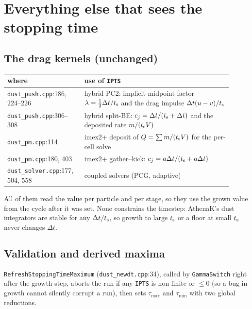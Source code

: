 \documentclass[11pt]{article}
\newcommand{\code}[1]{\texttt{#1}}
\newcommand{\file}[1]{\texttt{\small #1}}
\newcommand{\fn}[1]{\texttt{\small #1}}
\newcommand{\ts}{t_{\rm s}}
\begin{document}
\section{Everything else that sees the stopping time}\label{sec:consumers}

\subsection{The drag kernels (unchanged)}
\begin{longtable}{>{\raggedright}p{0.30\linewidth}p{0.62\linewidth}}
\toprule
where & use of \code{IPTS} \\
\midrule
\file{dust\_push.cpp}:186, 224--226 & hybrid PC2: implicit-midpoint factor
  $\lambda=\frac12\Delta t/\ts$ and the drag impulse $\Delta t(u-v)/\ts$ \\
\file{dust\_push.cpp}:306--308 & hybrid split-BE: $c_j=\Delta t/(\ts+\Delta t)$ and the
  deposited rate $m/(\ts V)$ \\
\file{dust\_pm.cpp}:114 & imex2+ deposit of $Q=\sum m/(\ts V)$ for the per-cell solve \\
\file{dust\_pm.cpp}:180, 403 & imex2+ gather--kick: $c_j=a\Delta t/(\ts+a\Delta t)$ \\
\file{dust\_solver.cpp}:177, 504, 558 & coupled solvers (PCG, adaptive) \\
\bottomrule
\end{longtable}
All of them read the value per particle and per stage, so they use the grown value from
the cycle after it was set. None constrains the timestep: AthenaK's dust integrators are
stable for any $\Delta t/\ts$, so growth to large $\ts$ or a floor at small $\ts$ never
changes $\Delta t$.

\subsection{Validation and derived maxima}
\fn{RefreshStoppingTimeMaximum} (\file{dust\_newdt.cpp}:34), called by
\fn{GammaSwitch} right after the growth step, aborts the run if any \code{IPTS} is
non-finite or $\le0$ (so a bug in growth cannot silently corrupt a run), then sets
$\tau_{\max}$ and $\tau_{\min}$ with two global reductions.
\end{document}
